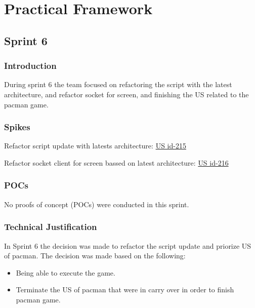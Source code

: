 \section{Practical Framework}

\subsection{Sprint 6}

\subsubsection{Introduction}
During sprint 6 the team focused on refactoring the script with the latest architecture, and refactor socket for screen, and finishing the US related to the pacman game. 

\subsubsection{Spikes}

    \item Refactor script update with latests architecture: \href{https://tree.taiga.io/project/joseluis-teran-coffeetime/us/215?milestone=396824}{US id-215}
    \item Refactor socket client for screen bassed on latest architecture: \href{https://tree.taiga.io/project/joseluis-teran-coffeetime/us/216?milestone=397461}{US id-216}

\subsubsection{POCs}

No proofs of concept (POCs) were conducted in this sprint.

\subsubsection{Technical Justification}
In Sprint 6 the decision was made to refactor the script update and priorize US of pacman. The decision was made based on the following:

\begin{itemize}
    \item  Being able to execute the game. 
    \item  Terminate the US of pacman that were in carry over in order to finish pacman game.
\end{itemize}

